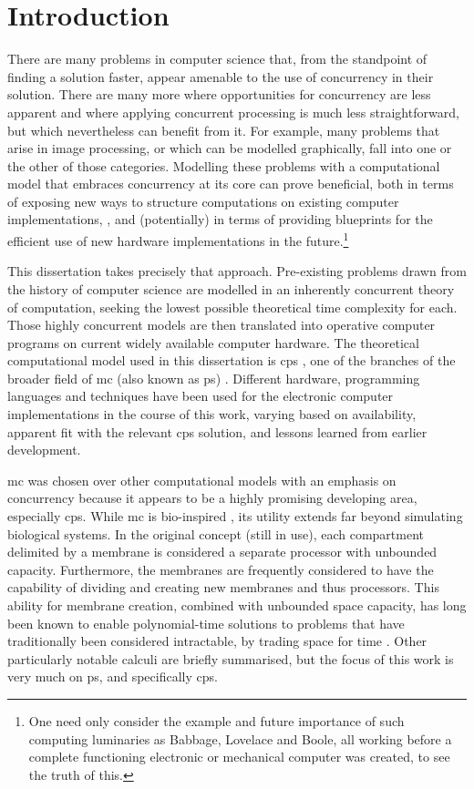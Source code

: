 \chapter{Introduction}

There are many problems in computer science that, from the standpoint of finding a solution faster, appear amenable to the use of concurrency in their solution.  There are many more where opportunities for concurrency are less apparent and where applying concurrent processing is much less straightforward, but which nevertheless can benefit from it.  For example, many problems that arise in image processing, or which can be modelled graphically, fall into one or the other of those categories.  Modelling these problems with a computational model that embraces concurrency at its core can prove beneficial, both in terms of exposing new ways to structure computations on existing computer implementations, \eg{} \cite{GimelFarb2013a,Nicolescu2014b}, and (potentially) in terms of providing blueprints for the efficient use of new hardware implementations in the future.\footnote{One need only consider the example and future importance of such computing luminaries as Babbage, Lovelace and Boole, all working before a complete functioning electronic or mechanical computer was created, to see the truth of this.}

This dissertation takes precisely that approach.  Pre-existing problems drawn from the history of computer science are modelled in an inherently concurrent theory of computation, seeking the lowest possible theoretical time complexity for each.  Those highly concurrent models are then translated into operative computer programs on current widely available computer hardware.  The theoretical computational model used in this dissertation is \gls{cps} \cite{Nicolescu2018}, one of the branches of the broader field of \gls{mc} (also known as \gls{ps}) \cite{Paun2010b,Paun2002}.  Different hardware, programming languages and techniques have been used for the electronic computer implementations in the course of this work, varying based on availability, apparent fit with the relevant \gls{cps} solution, and lessons learned from earlier development.

\Gls{mc} was chosen over other computational models with an emphasis on concurrency because it appears to be a highly promising developing area, especially \gls{cps}.  While \gls{mc} is bio-inspired \cite{Paun2000}, its utility extends far beyond simulating biological systems.  In the original concept (still in use), each \gls{compartment} delimited by a membrane is considered a separate processor with unbounded capacity.  Furthermore, the membranes are frequently considered to have the capability of dividing and creating new membranes and thus processors.  This ability for membrane creation, combined with unbounded space capacity, has long been known to enable polynomial-time solutions to problems that have traditionally been considered intractable, by trading space for time \cite{Paun1999a,Sosik2003}.
Other particularly notable calculi are briefly summarised, but the focus of this work is very much on \gls{ps}, and specifically \gls{cps}.

